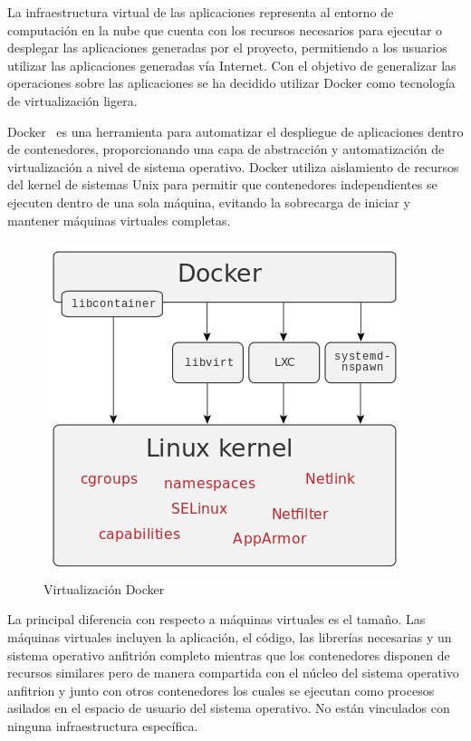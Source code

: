 \documentclass[a4paper,11pt]{book}
\begin{document}
La infraestructura virtual de las aplicaciones  representa al entorno de computación en la nube que cuenta con los recursos necesarios para ejecutar o desplegar las aplicaciones generadas por el proyecto, permitiendo a los usuarios utilizar las aplicaciones generadas vía Internet.
Con el objetivo de generalizar las operaciones sobre las aplicaciones  se ha decidido utilizar Docker como tecnología de virtualización ligera.

Docker~\cite{dk} es una herramienta para automatizar el despliegue de aplicaciones dentro de contenedores, proporcionando una capa de abstracción y automatización de virtualización a nivel de sistema operativo. Docker utiliza aislamiento de recursos del kernel de sistemas Unix  para permitir que contenedores independientes se ejecuten dentro de una sola máquina, evitando la sobrecarga de iniciar y mantener máquinas virtuales completas.

\begin{figure}[H]
\centering
\includegraphics[scale=0.35]{imagenes/docker.png}
\caption{ Virtualización Docker~\cite{dkw}}
\end{figure}

La principal diferencia con respecto a máquinas virtuales es el tamaño. Las máquinas virtuales incluyen la aplicación, el código, las librerías necesarias y un sistema operativo anfitrión completo mientras que los contenedores disponen de recursos similares pero de manera compartida con el núcleo  del sistema operativo anfitrion y junto con otros contenedores los cuales se ejecutan  como procesos asilados en el espacio de usuario del sistema operativo. No están vinculados con ninguna infraestructura específica.
\end{document}
